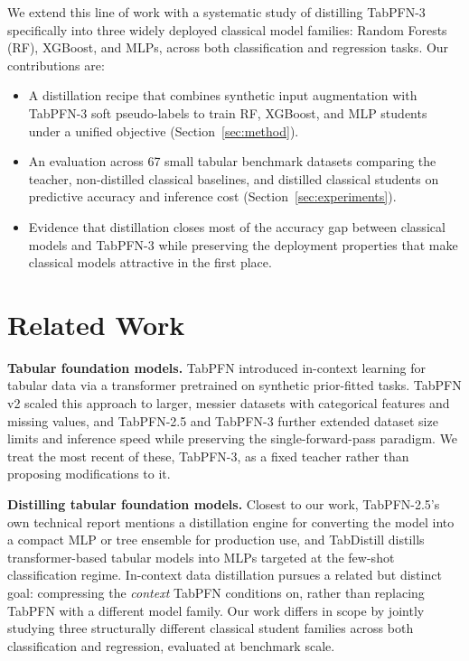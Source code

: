\documentclass[10pt]{article}
\begin{document}
We extend this line of work with a systematic study of distilling
TabPFN-3 specifically into three widely deployed classical model
families: Random Forests (RF), XGBoost, and MLPs, across both
classification and regression tasks. Our contributions are:
\begin{itemize}[leftmargin=1.4em,itemsep=2pt,topsep=4pt]
  \item A distillation recipe that combines synthetic input
        augmentation with TabPFN-3 soft pseudo-labels to train RF,
        XGBoost, and MLP students under a unified objective
        (Section~\ref{sec:method}).
  \item An evaluation across 67 small tabular benchmark datasets
        comparing the teacher, non-distilled classical baselines, and
        distilled classical students on predictive accuracy and
        inference cost (Section~\ref{sec:experiments}).
  \item Evidence that distillation closes most of the accuracy gap
        between classical models and TabPFN-3 while preserving the
        deployment properties that make classical models attractive
        in the first place.
\end{itemize}

\section{Related Work}
\textbf{Tabular foundation models.} TabPFN
\citep{hollmann2023tabpfn} introduced in-context learning for tabular
data via a transformer pretrained on synthetic prior-fitted tasks.
TabPFN v2 \citep{hollmann2025accurate} scaled this approach to larger,
messier datasets with categorical features and missing values, and
TabPFN-2.5 \citep{feuer2025tabpfn25} and TabPFN-3
\citep{priorlabs2026tabpfn3} further extended dataset size limits and
inference speed while preserving the single-forward-pass paradigm. We
treat the most recent of these, TabPFN-3, as a fixed teacher rather
than proposing modifications to it.

\textbf{Distilling tabular foundation models.} Closest to our work,
TabPFN-2.5's own technical report \citep{feuer2025tabpfn25} mentions a
distillation engine for converting the model into a compact MLP or
tree ensemble for production use, and TabDistill
\citep{tabdistill2025} distills transformer-based tabular models into
MLPs targeted at the few-shot classification regime. In-context data
distillation \citep{ictd2024} pursues a related but distinct goal:
compressing the \emph{context} TabPFN conditions on, rather than
replacing TabPFN with a different model family. Our work differs in
scope by jointly studying three structurally different classical
student families across both classification and regression, evaluated
at benchmark scale.
\end{document}
